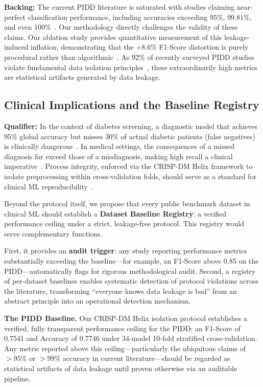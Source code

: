 \documentclass[3p,twocolumn]{elsarticle}
\begin{document}
\textbf{Backing:} The current PIDD literature is saturated with studies claiming near-perfect classification performance, including accuracies exceeding $95\%$, $99.81\%$, and even $100\%$~\cite{Mehta2024, Akbar2023, Chang2024, Deepalakshmi2025}. Our methodology directly challenges the validity of these claims. Our ablation study provides quantitative measurement of this leakage-induced inflation, demonstrating that the $+8.6\%$ F1-Score distortion is purely procedural rather than algorithmic~\cite{Wen2024Leakage}. As 92\% of recently surveyed PIDD studies violate fundamental data isolation principles~\cite{IllusionOfPerfection, Kapoor2024Leakage}, these extraordinarily high metrics are statistical artifacts generated by data leakage.

\subsection{Clinical Implications and the Baseline Registry}

\textbf{Qualifier:} In the context of diabetes screening, a diagnostic model that achieves $95\%$ global accuracy but misses $30\%$ of actual diabetic patients (false negatives) is clinically dangerous~\cite{Sali2025, Amri2025}. In medical settings, the consequences of a missed diagnosis far exceed those of a misdiagnosis, making high recall a clinical imperative~\cite{Amri2025, Sali2025}. Process integrity, enforced via the CRISP-DM Helix framework to isolate preprocessing within cross-validation folds, should serve as a standard for clinical ML reproducibility~\cite{Wen2024Leakage}.

Beyond the protocol itself, we propose that every public benchmark dataset in clinical ML should establish a \textbf{Dataset Baseline Registry}: a verified performance ceiling under a strict, leakage-free protocol. This registry would serve complementary functions.

First, it provides an \textbf{audit trigger}: any study reporting performance metrics substantially exceeding the baseline---for example, an F1-Score above 0.85 on the PIDD---automatically flags for rigorous methodological audit. Second, a registry of per-dataset baselines enables systematic detection of protocol violations across the literature, transforming ``everyone knows data leakage is bad'' from an abstract principle into an operational detection mechanism.

\textbf{The PIDD Baseline.} Our CRISP-DM Helix isolation protocol establishes a verified, fully transparent performance ceiling for the PIDD: an F1-Score of 0.7541 and Accuracy of 0.7746 under 34-model 10-fold stratified cross-validation. Any metric reported above this ceiling---particularly the ubiquitous claims of $>95\%$ or $>99\%$ accuracy in current literature---should be regarded as statistical artifacts of data leakage until proven otherwise via an auditable pipeline.
\end{document}
